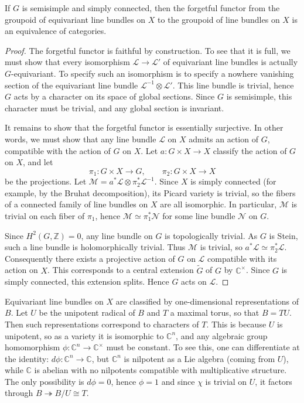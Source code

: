 \documentclass[12pt]{article}
\begin{document}
\begin{theorem}
    If $G$ is semisimple and simply connected, then the forgetful functor from the groupoid of equivariant line bundles on $X$ to the groupoid of line bundles on $X$ is an equivalence of categories.
\end{theorem}

\begin{proof}
    The forgetful functor is faithful by construction. To see that it is full, we must show that every isomorphism $\mathcal L \to \mathcal L'$ of equivariant line bundles is actually $G$-equivariant. To specify such an isomorphism is to specify a nowhere vanishing section of the equivariant line bundle $\mathcal L^{-1} \otimes \mathcal L'$. This line bundle is trivial, hence $G$ acts by a character on its space of global sections. Since $G$ is semisimple, this character must be trivial, and any global section is invariant.

    It remains to show that the forgetful functor is essentially surjective. In other words, we must show that any line bundle $\mathcal L$ on $X$ admits an action of $G$, compatible with the action of $G$ on $X$. Let $a : G \times X \to X$ classify the action of $G$ on $X$, and let
    \[
        \pi_1 : G \times X \to G, \qquad \pi_2 : G \times X \to X
    \]
    be the projections. Let $\mathcal M = a^*\mathcal L \otimes \pi_2^*\mathcal L^{-1}$. Since $X$ is simply connected (for example, by the Bruhat decomposition), its Picard variety is trivial, so the fibers of a connected family of line bundles on $X$ are all isomorphic. In particular, $\mathcal M$ is trivial on each fiber of $\pi_1$, hence $\mathcal M \simeq \pi_1^*\mathcal N$ for some line bundle $\mathcal N$ on $G$.

    Since $H^2(G,\mathbb Z)=0$, any line bundle on $G$ is topologically trivial. As $G$ is Stein, such a line bundle is holomorphically trivial. Thus $\mathcal M$ is trivial, so $a^*\mathcal L \simeq \pi_2^*\mathcal L$. Consequently there exists a projective action of $G$ on $\mathcal L$ compatible with its action on $X$. This corresponds to a central extension $\widetilde G$ of $G$ by $\mathbb C^\times$. Since $G$ is simply connected, this extension splits. Hence $G$ acts on $\mathcal L$.
\end{proof}


Equivariant line bundles on $X$ are classified by one-dimensional representations of $B$. Let $U$ be the unipotent radical of $B$ and $T$ a maximal torus, so that $B = TU$. Then such representations correspond to characters of $T$. This is because $U$ is unipotent, so as a variety it is isomorphic to $\mathbb C^n$, and any algebraic group homomorphism
$\phi : \mathbb C^n \to \mathbb C^\times$
must be constant. To see this, one can differentiate at the identity:
$d\phi : \mathbb C^n \to \mathbb C$, but $\mathbb C^n$ is nilpotent as a Lie algebra (coming from $U$), while $\mathbb C$ is abelian with no nilpotents compatible with multiplicative structure. The only possibility is $d\phi=0$, hence $\phi=1$ and since $\chi$ is trivial on $U$, it factors through $B \twoheadrightarrow B/U \cong T$.
\end{document}
